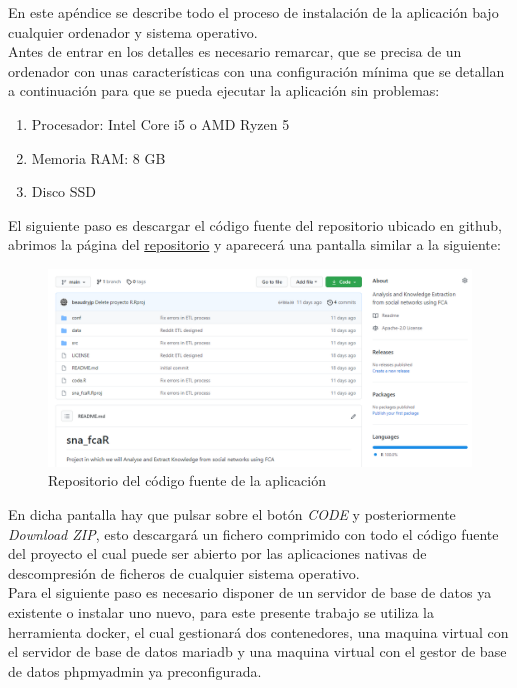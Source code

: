\documentclass[../../main.tex]{subfiles}
\begin{document}
En este apéndice se describe todo el proceso de instalación de la aplicación bajo cualquier ordenador y sistema operativo. \\
Antes de entrar en los detalles es necesario remarcar, que se precisa de un ordenador con unas características con una configuración mínima que se detallan a continuación para que se pueda ejecutar la aplicación sin problemas:
\begin{enumerate}
\item Procesador: Intel Core i5 o AMD Ryzen 5
\item Memoria RAM: 8 GB
\item Disco SSD
\end{enumerate}

El siguiente paso es descargar el código fuente del repositorio ubicado en \Gls{github}, abrimos la página del  \href{https://github.com/beaudryjp/sna_fcaR}{repositorio} y aparecerá una pantalla similar a la siguiente:

\begin{figure}[h]
\centering
\includegraphics[width=\textwidth]{images/apendices/github1.png}
\caption{Repositorio del código fuente de la aplicación}
\end{figure}

En dicha pantalla hay que pulsar sobre el botón \textit{CODE} y posteriormente \textit{Download ZIP}, esto descargará un fichero comprimido con todo el código fuente del proyecto el cual puede ser abierto por las aplicaciones nativas de descompresión de ficheros de cualquier sistema operativo. \\


Para el siguiente paso es necesario disponer de un servidor de base de datos ya existente o instalar uno nuevo, para este presente trabajo se utiliza la herramienta \Gls{docker}\cite{doc10}, el cual gestionará dos contenedores, una maquina virtual con el servidor de base de datos \gls{mariadb}\cite{doc11} y una maquina virtual con el gestor de base de datos \gls{phpmyadmin}\cite{doc12} ya preconfigurada.\\
\end{document}
